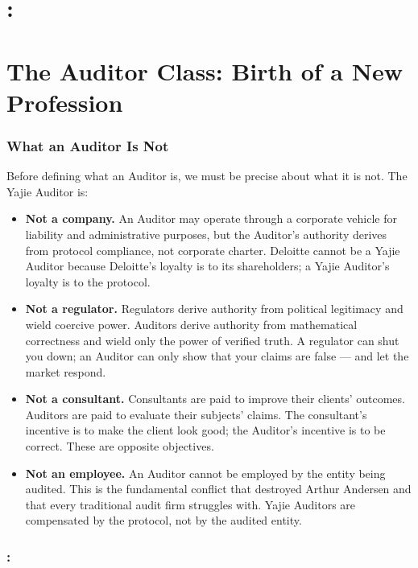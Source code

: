 \documentclass[12pt,a4paper]{article}
\theoremstyle{remark}
\begin{document}
\part{: }
\part{The Auditor Class: Birth of a New Profession}
\section{}
\section{What an Auditor Is Not}
Before defining what an Auditor is, we must be precise about what it is not. The Yajie 
Auditor is:
\begin{itemize}[leftmargin=*, itemsep=6pt]
 \item \textbf{Not a company.} An Auditor may operate through a corporate vehicle for 
 liability and administrative purposes, but the Auditor's authority derives from 
 protocol compliance, not corporate charter. Deloitte cannot be a Yajie Auditor 
 because Deloitte's loyalty is to its shareholders; a Yajie Auditor's loyalty is 
 to the protocol. \
 \item \textbf{Not a regulator.} Regulators derive authority from political legitimacy 
 and wield coercive power. Auditors derive authority from mathematical correctness 
 and wield only the power of verified truth. A regulator can shut you down; an 
 Auditor can only show that your claims are false --- and let the market respond. 
 \item \textbf{Not a consultant.} Consultants are paid to improve their clients' 
 outcomes. Auditors are paid to evaluate their subjects' claims. The consultant's 
 incentive is to make the client look good; the Auditor's incentive is to be 
 correct. These are opposite objectives. \
 \item \textbf{Not an employee.} An Auditor cannot be employed by the entity being 
 audited. This is the fundamental conflict that destroyed Arthur Andersen and 
 that every traditional audit firm struggles with. Yajie Auditors are compensated 
 by the protocol, not by the audited entity. \
\end{itemize}
\section{:}
\end{document}
